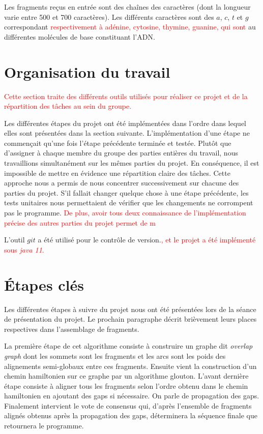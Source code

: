 \documentclass{article}
\begin{document}
Les fragments reçus en entrée sont des chaînes des caractères (dont la longueur varie entre 500 et 700 caractères). Les différents caractères sont des $a$, $c$, $t$ et $g$ correspondant \textcolor{red}{respectivement à adénine, cytosine, thymine, guanine, qui sont} au différentes molécules de base constituant l'ADN.


\section{Organisation du travail}

\textcolor{red}{
Cette section traite des différents outils utilisés pour réaliser ce projet et de la répartition des tâches au sein du groupe.}

Les différentes étapes du projet ont été implémentées dans l'ordre dans lequel elles sont présentées dans la section suivante. 
L'implémentation d'une étape ne commençait qu'une fois l'étape précédente terminée et testée. Plutôt que d'assigner à chaque membre du groupe des parties entières du travail, nous travaillions simultanément sur les mêmes parties du projet. En conséquence, il est impossible de mettre en évidence une répartition claire des tâches. Cette approche nous a permis de nous concentrer successivement sur chacune des parties du projet. S'il fallait changer quelque chose à une étape précédente, les tests unitaires nous permettaient de vérifier que les changements ne corrompent pas le programme. \textcolor{red}{ De plus, avoir tous deux connaissance de l'implémentation précise des autres parties du projet permet de m}



L'outil $git$ a été utilisé pour le contrôle de version.\textcolor{red}{, et le projet a été implémenté sous \textit{java 11}.}


\newpage

\section{\'Etapes clés}

Les différentes étapes à suivre du projet nous ont été présentées lors de la séance de présentation du projet. Le prochain paragraphe décrit brièvement leurs places respectives dans l'assemblage de fragments.

La première étape de cet algorithme consiste à construire un graphe dit \textit{overlap graph} dont les sommets sont les fragments   et les arcs sont les poids des alignements semi-globaux entre ces fragments.
Ensuite vient la construction d'un chemin hamiltonien sur ce graphe par un algorithme glouton.
L'avant dernière étape consiste à aligner tous les fragments selon l'ordre obtenu dans le chemin hamiltonien en ajoutant des gaps si nécessaire. On parle de propagation des gaps.
Finalement intervient le vote de consensus qui, d'après l'ensemble de fragments alignés obtenus après la propagation des gaps, déterminera la séquence finale que retournera le programme.
\end{document}

